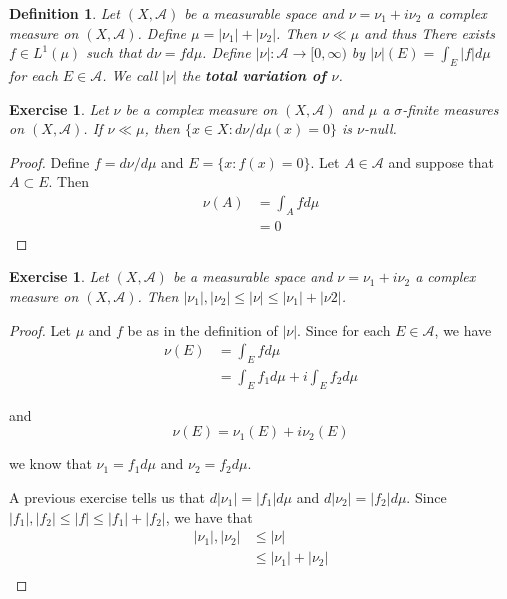 \documentclass[12pt]{amsart}
\newtheorem{defn}[thm]{Definition}
\newtheorem{ex}[thm]{Exercise}
\newcommand{\sig}{\sigma}
\newcommand{\MA}{\mathcal{A}}
\newcommand{\Rg}{[0,\infty)}
\begin{document}
\begin{defn}Let $(X,\MA)$ be a measurable space and $\nu = \nu_1 + i \nu_2$ a complex measure on $(X, \MA)$. Define $\mu = |\nu_1| + |\nu_2|$. Then $\nu \ll \mu$ and thus There exists $f \in L^1(\mu)$ such that $d\nu = f d\mu$. Define $|\nu|: \MA \rightarrow \Rg$ by $|\nu|(E) = \int_E |f|d\mu$ for each $E \in \MA$. We call $|\nu|$ the \textbf{total variation of $\nu$}. 
\end{defn}

\begin{ex}
Let $\nu$ be a complex measure on $(X, \MA)$ and $\mu$ a $\sig$-finite measures on $(X,\MA)$. If $\nu \ll \mu$, then $\{x \in X: d\nu / d \mu(x) = 0 \}$ is $\nu$-null.
\end{ex}

\begin{proof}
Define $f = d\nu / d \mu$ and $E = \{x: f(x) = 0\}$. Let $A \in \MA$ and suppose that $A \subset E$. Then 
\begin{align*}
\nu(A) 
&= \int_A f d\mu\\
&= 0
\end{align*} 
\end{proof}

\begin{ex}
Let $(X, \MA)$ be a measurable space and $\nu = \nu_1 + i\nu_2$ a complex measure on $(X, \MA)$. Then $|\nu_1|, |\nu_2| \leq |\nu| \leq |\nu_1| + |\nu2|$.

\end{ex}

\begin{proof}
Let $\mu$ and $f$ be as in the definition of $|\nu|$. Since for each $E \in \MA$, we have 
\begin{align*}
\nu(E) 
&= \int_E f d\mu\\
&= \int_E f_1 d \mu + i \int_E f_2 d\mu
\end{align*}

and $$\nu(E) = \nu_1(E) + i\nu_2(E)$$

we know that $\nu_1 = f_1 d\mu$ and $\nu_2 = f_2 d \mu$. 

A previous exercise tells us that $d|\nu_1| = |f_1|d\mu$ and $d |\nu_2| = |f_2|d \mu$. Since $|f_1|, |f_2| \leq |f| \leq |f_1|+|f_2|$, we have that 
\begin{align*}
|\nu_1|, |\nu_2| 
&\leq |\nu| \\
&\leq |\nu_1| + |\nu_2|\\
\end{align*}
\end{proof}
\end{document}
